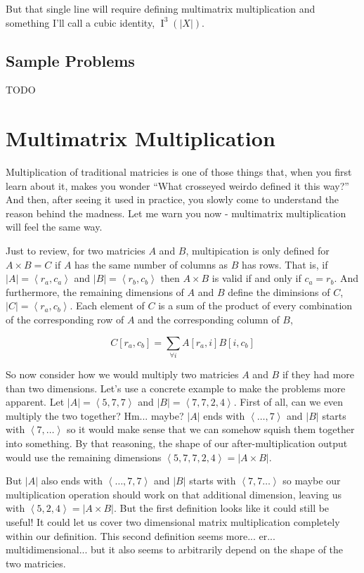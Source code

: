 \documentclass[12pt]{article}
\theoremstyle{definition}
\theoremstyle{plain}
\theoremstyle{ppart}
\DeclareMathOperator{\Ident}{I}
\begin{document}
But that single line will require defining multimatrix multiplication and
something I'll call a cubic identity, $\Ident^3(|X|)$.

\subsection*{Sample Problems}
TODO

\section{Multimatrix Multiplication}

Multiplication of traditional matricies is one of those things that, when you
first learn about it, makes you wonder ``What crosseyed weirdo defined it this way?''
And then, after seeing it used in practice, you slowly come to understand the
reason behind the madness. Let me warn you now - multimatrix multiplication will
feel the same way.

Just to review, for two matricies $A$ and $B$, multipication is only defined
for $A \times B = C$ if $A$ has the same number of columns as $B$ has rows.
That is, if $|A| = \left< r_a, c_a \right>$ and $|B| = \left< r_b, c_b \right>$
then $A \times B$ is valid if and only if $c_a = r_b$. And furthermore,
the remaining dimensions of $A$ and $B$ define the diminsions of $C$,
$|C| = \left< r_a, c_b \right>$. Each element of $C$ is a sum of the product of
every combination of the corresponding row of $A$ and the corresponding column of
$B$,

\[ C[r_a, c_b] = \sum_{\forall i} A[r_a, i] B[i, c_b] \]

So now consider how we would multiply two matricies $A$ and $B$ if they had more
than two dimensions. Let's use a concrete example to make the problems more apparent.
Let $|A| = \left<5,7,7\right>$ and $|B| = \left<7,7,2,4\right>$.
First of all, can we even multiply the two together? Hm... maybe? $|A|$ ends with
$\left<\ldots, 7\right>$ and $|B|$ starts with $\left<7,\ldots\right>$ so it would
make sense that we can somehow squish them together into something. By that reasoning,
the shape of our after-multiplication output would use the remaining dimensions
$\left<5, 7, 7, 2, 4\right> = |A \times B|$.

But $|A|$ also ends with $\left<\ldots, 7, 7\right>$ and $|B|$ starts with
$\left<7, 7\ldots\right>$ so maybe our multiplication operation should work on that
additional dimension, leaving us with $\left<5, 2, 4\right> = |A \times B|$.
But the first definition looks like it could still be useful! It could let us cover 
two dimensional matrix multiplication completely within our definition. This second
definition seems more... er... multidimensional... but it also seems to
arbitrarily depend on the shape of the two matricies.
\end{document}
